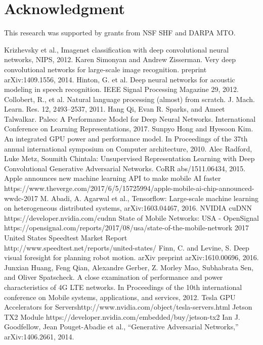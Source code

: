 \documentclass[conference,9pt]{IEEEtran}
\begin{document}
\section*{Acknowledgment}
This research was supported by grants from NSF SHF and DARPA MTO. 
\begin{thebibliography}{00}
 Krizhevsky et al., Imagenet classification with deep convolutional
neural networks, NIPS, 2012.
 Karen Simonyan and Andrew Zisserman. Very deep convolutional
networks for large-scale image recognition. preprint arXiv:1409.1556, 2014.
 Hinton, G. et al. Deep neural networks for acoustic modeling in speech recognition. IEEE Signal Processing Magazine 29, 2012.
 Collobert, R., et al. Natural language processing (almost) from scratch. J. Mach. Learn. Res. 12, 2493–2537, 2011.
 Hang Qi, Evan R. Sparks, and Ameet Talwalkar. Paleo: A Performance Model for Deep Neural Networks. International Conference on Learning Representations, 2017.
 Sunpyo Hong and Hyesoon Kim. An integrated GPU power and performance model. In Proceedings of the 37th annual international symposium on Computer architecture, 2010.
 Alec Radford, Luke Metz, Soumith Chintala:
Unsupervised Representation Learning with Deep Convolutional Generative Adversarial Networks. CoRR abs/1511.06434, 2015.
 Apple announces new machine learning API to make mobile AI faster https://www.theverge.com/2017/6/5/15725994/apple-mobile-ai-chip-announced-wwdc-2017
M. Abadi, A. Agarwal et al., Tensorflow: Large-scale
machine learning on heterogeneous distributed systems, arXiv:1603.04467, 2016.
 NVIDIA cuDNN https://developer.nvidia.com/cudnn
 State of Mobile Networks: USA - OpenSignal https://opensignal.com/reports/2017/08/usa/state-of-the-mobile-network
 2017 United States Speedtest Market Report http://www.speedtest.net/reports/united-states/
 Finn, C. and Levine, S. Deep visual foresight for planning robot motion. arXiv preprint arXiv:1610.00696, 2016.
 Junxian Huang, Feng Qian, Alexandre Gerber, Z. Morley Mao, Subhabrata Sen, and Oliver Spatscheck. A close examination of performance and power characteristics of 4G LTE networks. In Proceedings of the 10th international conference on Mobile systems, applications, and services, 2012.
 Tesla GPU Accelerators for Servershttp://www.nvidia.com/object/tesla-servers.html
 Jetson TX2 Module https://developer.nvidia.com/embedded/buy/jetson-tx2
 Ian J. Goodfellow, Jean Pouget-Abadie et al., “Generative Adversarial Networks,” arXiv:1406.2661, 2014.

\end{thebibliography}
\end{document}
